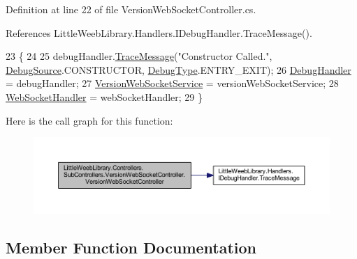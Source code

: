 Definition at line 22 of file Version\+Web\+Socket\+Controller.\+cs.



References Little\+Weeb\+Library.\+Handlers.\+I\+Debug\+Handler.\+Trace\+Message().


\begin{DoxyCode}
23         \{
24 
25             debugHandler.\mbox{\hyperlink{interface_little_weeb_library_1_1_handlers_1_1_i_debug_handler_a2e405bc3492e683cd3702fae125221bc}{TraceMessage}}(\textcolor{stringliteral}{"Constructor Called."}, 
      \mbox{\hyperlink{namespace_little_weeb_library_1_1_handlers_a2a6ca0775121c9c503d58aa254d292be}{DebugSource}}.CONSTRUCTOR, \mbox{\hyperlink{namespace_little_weeb_library_1_1_handlers_ab66019ed40462876ec4e61bb3ccb0a62}{DebugType}}.ENTRY\_EXIT);
26             \mbox{\hyperlink{class_little_weeb_library_1_1_handlers_1_1_debug_handler}{DebugHandler}} = debugHandler;
27             \mbox{\hyperlink{class_little_weeb_library_1_1_services_1_1_version_web_socket_service}{VersionWebSocketService}} = versionWebSocketService;
28             \mbox{\hyperlink{class_little_weeb_library_1_1_handlers_1_1_web_socket_handler}{WebSocketHandler}} = webSocketHandler;
29         \}
\end{DoxyCode}
Here is the call graph for this function\+:\nopagebreak
\begin{figure}[H]
\begin{center}
\leavevmode
\includegraphics[width=350pt]{class_little_weeb_library_1_1_controllers_1_1_sub_controllers_1_1_version_web_socket_controller_a8c030dabf1c19d49efa902ef97a84f7a_cgraph}
\end{center}
\end{figure}


\subsection{Member Function Documentation}
\mbox{\label{class_little_weeb_library_1_1_controllers_1_1_sub_controllers_1_1_version_web_socket_controller_aecbfb94508db51693b11ea8dba9cf7e9}} 
